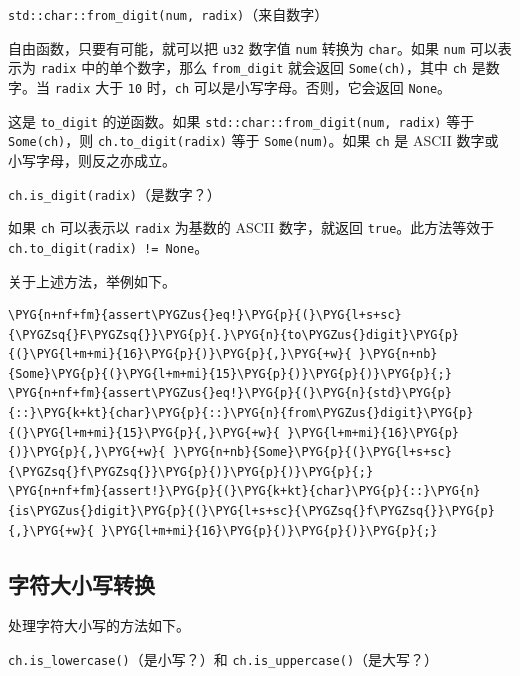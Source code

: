 \begin{myNote}
\texttt{std::char::from\_digit(num, radix)}（来自数字）
\end{myNote}

自由函数，只要有可能，就可以把 \texttt{u32} 数字值 \texttt{num} 转换为 \texttt{char}。如果 \texttt{num} 可以表示为 \texttt{radix} 中的单个数字，那么 \texttt{from\_digit} 就会返回 \texttt{Some(ch)}，其中 \texttt{ch} 是数字。当 \texttt{radix} 大于 \texttt{10} 时，\texttt{ch} 可以是小写字母。否则，它会返回 \texttt{None}。

这是 \texttt{to\_digit} 的逆函数。如果 \texttt{std::char::from\_digit(num, radix)} 等于 \texttt{Some(ch)}，则 \texttt{ch.to\_digit(radix)} 等于 \texttt{Some(num)}。如果 \texttt{ch} 是 ASCII 数字或小写字母，则反之亦成立。

\begin{mySidenote}
\texttt{ch.is\_digit(radix)}（是数字？）
\end{mySidenote}

如果 \texttt{ch} 可以表示以 \texttt{radix} 为基数的 ASCII 数字，就返回 \texttt{true}。此方法等效于 \texttt{ch.to\_digit(radix) != None}。

关于上述方法，举例如下。

\begin{Verbatim}[commandchars=\\\{\},breaklines=true,breakanywhere=true,fontsize=\codefont,xleftmargin=17bp]
\PYG{n+nf+fm}{assert\PYGZus{}eq!}\PYG{p}{(}\PYG{l+s+sc}{\PYGZsq{}F\PYGZsq{}}\PYG{p}{.}\PYG{n}{to\PYGZus{}digit}\PYG{p}{(}\PYG{l+m+mi}{16}\PYG{p}{)}\PYG{p}{,}\PYG{+w}{ }\PYG{n+nb}{Some}\PYG{p}{(}\PYG{l+m+mi}{15}\PYG{p}{)}\PYG{p}{)}\PYG{p}{;}
\PYG{n+nf+fm}{assert\PYGZus{}eq!}\PYG{p}{(}\PYG{n}{std}\PYG{p}{::}\PYG{k+kt}{char}\PYG{p}{::}\PYG{n}{from\PYGZus{}digit}\PYG{p}{(}\PYG{l+m+mi}{15}\PYG{p}{,}\PYG{+w}{ }\PYG{l+m+mi}{16}\PYG{p}{)}\PYG{p}{,}\PYG{+w}{ }\PYG{n+nb}{Some}\PYG{p}{(}\PYG{l+s+sc}{\PYGZsq{}f\PYGZsq{}}\PYG{p}{)}\PYG{p}{)}\PYG{p}{;}
\PYG{n+nf+fm}{assert!}\PYG{p}{(}\PYG{k+kt}{char}\PYG{p}{::}\PYG{n}{is\PYGZus{}digit}\PYG{p}{(}\PYG{l+s+sc}{\PYGZsq{}f\PYGZsq{}}\PYG{p}{,}\PYG{+w}{ }\PYG{l+m+mi}{16}\PYG{p}{)}\PYG{p}{)}\PYG{p}{;}
\end{Verbatim}

\subsection{字符大小写转换}

处理字符大小写的方法如下。

\begin{myNote}
\texttt{ch.is\_lowercase()}（是小写？）和 \texttt{ch.is\_uppercase()}（是大写？）
\end{myNote}

